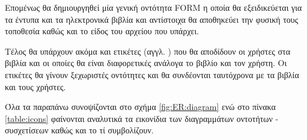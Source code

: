 \documentclass{assignment}
\begin{document}
Επομένως θα δημιουργηθεί μία γενική οντότητα FORM η οποία θα εξειδικεύεται για τα έντυπα και τα ηλεκτρονικά βιβλία και αντίστοιχα θα αποθηκεύει την φυσική τους τοποθεσία καθώς και το είδος του αρχείου που υπάρχει.

Τέλος θα υπάρχουν ακόμα και ετικέτες (αγγλ. ) που θα αποδίδουν οι χρήστες στα βιβλία και οι οποίες θα είναι διαφορετικές ανάλογα το βιβλίο και τον χρήστη. Οι ετικέτες θα γίνουν ξεχωριστές οντότητες και θα συνδέονται ταυτόχρονα με τα βιβλία και τους χρήστες.

Όλα τα παραπάνω συνοψίζονται στο σχήμα \ref{fig:ER:diagram} ενώ στο πίνακα \ref{table:icons} φαίνονται αναλυτικά τα εικονίδια των διαγραμμάτων οντοτήτων - συσχετίσεων καθώς και το τί συμβολίζουν.


\end{document}
